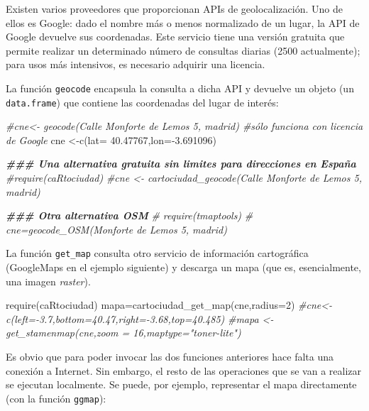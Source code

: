 \documentclass[
]{article}
\newenvironment{Shaded}{\begin{snugshade}}{\end{snugshade}}
\newcommand{\AttributeTok}[1]{\textcolor[rgb]{0.77,0.63,0.00}{#1}}
\newcommand{\CommentTok}[1]{\textcolor[rgb]{0.56,0.35,0.01}{\textit{#1}}}
\newcommand{\DecValTok}[1]{\textcolor[rgb]{0.00,0.00,0.81}{#1}}
\newcommand{\DocumentationTok}[1]{\textcolor[rgb]{0.56,0.35,0.01}{\textbf{\textit{#1}}}}
\newcommand{\FloatTok}[1]{\textcolor[rgb]{0.00,0.00,0.81}{#1}}
\newcommand{\FunctionTok}[1]{\textcolor[rgb]{0.00,0.00,0.00}{#1}}
\newcommand{\NormalTok}[1]{#1}
\newcommand{\OtherTok}[1]{\textcolor[rgb]{0.56,0.35,0.01}{#1}}
\newcommand{\SpecialCharTok}[1]{\textcolor[rgb]{0.00,0.00,0.00}{#1}}
\numberwithin{ejcnt}{section}
\begin{document}
Existen varios proveedores que proporcionan APIs de geolocalización. Uno de ellos es Google: dado el nombre más o menos normalizado de un lugar, la API de Google devuelve sus coordenadas. Este servicio tiene una versión gratuita que permite realizar un determinado número de consultas diarias (2500 actualmente); para usos más intensivos, es necesario adquirir una licencia.

La función \texttt{geocode} encapsula la consulta a dicha API y devuelve un objeto (un \texttt{data.frame}) que contiene las coordenadas del lugar de interés:

\begin{Shaded}
\begin{Highlighting}[]
\CommentTok{\#cne\textless{}{-} geocode(\textquotesingle{}Calle Monforte de Lemos 5, madrid\textquotesingle{}) \#sólo funciona con licencia de Google}
\NormalTok{cne }\OtherTok{\textless{}{-}}\FunctionTok{c}\NormalTok{(}\AttributeTok{lat=} \FloatTok{40.47767}\NormalTok{,}\AttributeTok{lon=}\SpecialCharTok{{-}}\FloatTok{3.691096}\NormalTok{)}

\DocumentationTok{\#\#\# Una alternativa gratuita sin limites para direcciones en España }
\CommentTok{\#require(caRtociudad)}
\CommentTok{\#cne \textless{}{-} cartociudad\_geocode(\textquotesingle{}Calle Monforte de Lemos 5, madrid\textquotesingle{})}

\DocumentationTok{\#\#\# Otra alternativa OSM}
\CommentTok{\# require(tmaptools)}
\CommentTok{\# cne=geocode\_OSM(\textquotesingle{}Monforte de Lemos 5, madrid\textquotesingle{})}
\end{Highlighting}
\end{Shaded}

La función \texttt{get\_map} consulta otro servicio de información cartográfica (GoogleMaps en el ejemplo siguiente) y descarga un mapa (que es, esencialmente, una imagen \emph{raster}).

\begin{Shaded}
\begin{Highlighting}[]
\FunctionTok{require}\NormalTok{(caRtociudad)}
\NormalTok{mapa}\OtherTok{=}\FunctionTok{cartociudad\_get\_map}\NormalTok{(cne,}\AttributeTok{radius=}\DecValTok{2}\NormalTok{)}
\CommentTok{\#cne\textless{}{-}c(left={-}3.7,bottom=40.47,right={-}3.68,top=40.485)}
\CommentTok{\#mapa \textless{}{-} get\_stamenmap(cne,zoom = 16,maptype="toner{-}lite")}
\end{Highlighting}
\end{Shaded}

Es obvio que para poder invocar las dos funciones anteriores hace falta una conexión a Internet. Sin embargo, el resto de las operaciones que se van a realizar se ejecutan localmente. Se puede, por ejemplo, representar el mapa directamente (con la función \texttt{ggmap}):
\end{document}
